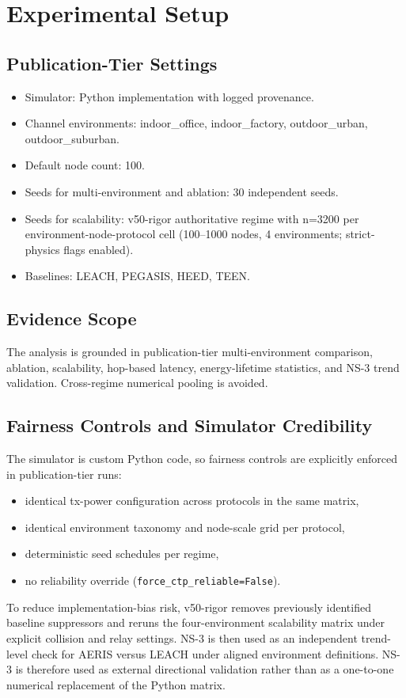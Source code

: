 ﻿\documentclass[sensors,article,submit,moreauthors,pdftex]{Definitions/mdpi}
\begin{document}
\section{Experimental Setup}
\subsection{Publication-Tier Settings}
\begin{itemize}
\item Simulator: Python implementation with logged provenance.
\item Channel environments: indoor\_office, indoor\_factory, outdoor\_urban, outdoor\_suburban.
\item Default node count: 100.
\item Seeds for multi-environment and ablation: 30 independent seeds.
\item Seeds for scalability: v50-rigor authoritative regime with n=3200 per environment-node-protocol cell (100--1000 nodes, 4 environments; strict-physics flags enabled).
\item Baselines: LEACH, PEGASIS, HEED, TEEN.
\end{itemize}

\subsection{Evidence Scope}
The analysis is grounded in publication-tier multi-environment comparison, ablation, scalability, hop-based latency, energy-lifetime statistics, and NS-3 trend validation. Cross-regime numerical pooling is avoided.

\subsection{Fairness Controls and Simulator Credibility}
The simulator is custom Python code, so fairness controls are explicitly enforced in publication-tier runs:
\begin{itemize}
\item identical tx-power configuration across protocols in the same matrix,
\item identical environment taxonomy and node-scale grid per protocol,
\item deterministic seed schedules per regime,
\item no reliability override (\texttt{force\_ctp\_reliable=False}).
\end{itemize}

To reduce implementation-bias risk, v50-rigor removes previously identified baseline suppressors and reruns the four-environment scalability matrix under explicit collision and relay settings. NS-3 is then used as an independent trend-level check for AERIS versus LEACH under aligned environment definitions. NS-3 is therefore used as external directional validation rather than as a one-to-one numerical replacement of the Python matrix.
\end{document}
